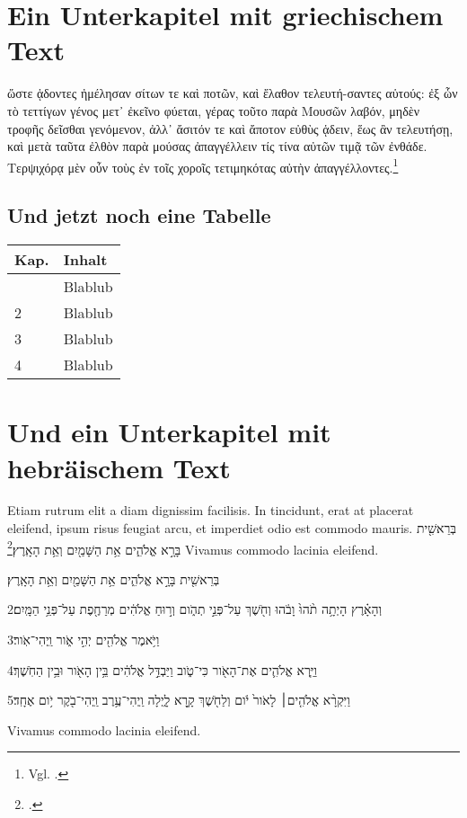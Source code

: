 \section{Ein Unterkapitel mit griechischem Text}
\textgreek{ὥστε ᾁδοντες ἠμέλησαν σίτων τε καὶ ποτῶν, καὶ ἔλαθον τελευτή-σαντες αὑτούς: ἐξ ὧν τὸ τεττίγων γένος μετ᾽ ἐκεῖνο φύεται, γέρας τοῦτο παρὰ Μουσῶν λαβόν, μηδὲν τροφῆς δεῖσθαι γενόμενον, ἀλλ᾽ ἄσιτόν τε καὶ ἄποτον εὐθὺς ᾁδειν, ἕως ἂν τελευτήσῃ, καὶ μετὰ ταῦτα ἐλθὸν παρὰ μούσας ἀπαγγέλλειν τίς τίνα αὐτῶν τιμᾷ τῶν ἐνθάδε. Τερψιχόρᾳ μὲν οὖν τοὺς ἐν τοῖς χοροῖς τετιμηκότας αὐτὴν ἀπαγγέλλοντες.}\footnote{Vgl. .}
 \subsection{Und jetzt noch eine Tabelle}
\begin{longtable}{p{}p{}} %
	\hline
	Kap. &  Inhalt \\
	\hline
	\endhead %
	\hline
	\endfoot %
	1 & Blablub \\ %
	2 & Blablub \\
	3 & Blablub \\		
	4 & Blablub \\
\end{longtable}
\section{Und ein Unterkapitel mit hebräischem Text}
Etiam rutrum elit a diam dignissim facilisis. In tincidunt, erat at
placerat eleifend, ipsum risus feugiat arcu, et imperdiet odio est
commodo mauris. \texthebrew{בְּרֵאשִׁ֖ית בָּרָ֣א אֱלֹהִ֑ים אֵ֥ת הַשָּׁמַ֖יִם וְאֵ֥ת
  הָאָֽרֶץ׃}\footnote{.}  Vivamus commodo lacinia
eleifend.

\begin{hebrew}
בְּרֵאשִׁ֖ית בָּרָ֣א אֱלֹהִ֑ים אֵ֥ת הַשָּׁמַ֖יִם וְאֵ֥ת הָאָֽרֶץ׃

2וְהָאָ֗רֶץ הָיְתָ֥ה תֹ֨הוּ֙ וָבֹ֔הוּ וְחֹ֖שֶׁךְ עַל־פְּנֵ֣י תְהֹ֑ום וְר֣וּחַ אֱלֹהִ֔ים מְרַחֶ֖פֶת עַל־פְּנֵ֥י הַמָּֽיִם׃

3וַיֹּ֥אמֶר אֱלֹהִ֖ים יְהִ֣י אֹ֑ור וַֽיְהִי־אֹֽור׃

4וַיַּ֧רְא אֱלֹהִ֛ים אֶת־הָאֹ֖ור כִּי־טֹ֑וב וַיַּבְדֵּ֣ל אֱלֹהִ֔ים בֵּ֥ין הָאֹ֖ור וּבֵ֥ין הַחֹֽשֶׁךְ׃

5וַיִּקְרָ֨א אֱלֹהִ֤ים׀ לָאֹור֙ יֹ֔ום וְלַחֹ֖שֶׁךְ קָ֣רָא לָ֑יְלָה וַֽיְהִי־עֶ֥רֶב וַֽיְהִי־בֹ֖קֶר יֹ֥ום אֶחָֽד׃

\end{hebrew}

 Vivamus commodo lacinia eleifend.
